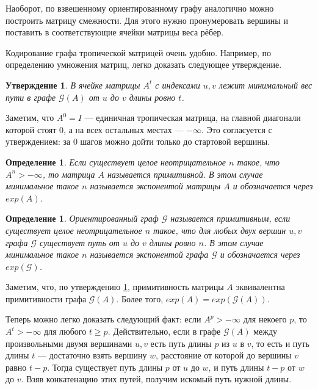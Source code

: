 \documentclass[12pt]{article}
\newtheorem{definition}[theorem]{Определение}
\newtheorem{proposition}[theorem]{Утверждение}
\begin{document}
Наоборот, по взвешенному ориентированному графу аналогично можно построить матрицу смежности. Для этого нужно пронумеровать вершины и поставить в соответствующие ячейки матрицы веса рёбер.

Кодирование графа тропической матрицей очень удобно. Например, по определению умножения матриц, легко доказать следующее утверждение.

\begin{proposition}
\label{entriesInPower}
В ячейке матрицы $A^t$ с индексами $u, v$ лежит минимальный вес пути в графе $\mathcal{G}(A)$ от $u$ до $v$ длины ровно $t$.
\end{proposition}

Заметим, что $A^0 = I$ --- единичная тропическая матрица, на главной диагонали которой стоят $0$, а на всех остальных местах --- $-\infty$. Это согласуется с утверждением: за $0$ шагов можно дойти только до стартовой вершины.

\begin{definition}
Если существует целое неотрицательное $n$ такое, что $A^n > -\infty$, то матрица $A$ называется примитивной. В этом случае минимальное такое $n$ называется экспонентой матрицы $A$ и обозначается через $exp(A)$.
\end{definition}

\begin{definition}
Ориентированный граф $\mathcal{G}$ называется примитивным, если существует целое неотрицательное $n$ такое, что для любых двух вершин $u, v$ графа $\mathcal{G}$ существует путь от $u$ до $v$ длины ровно $n$. В этом случае минимальное такое $n$ называется экспонентой графа $\mathcal{G}$ и обозначается через $exp(\mathcal{G})$.
\end{definition}

Заметим, что, по утверждению \ref{entriesInPower}, примитивность матрицы $A$ эквивалентна примитивности графа $\mathcal{G}(A)$. Более того, $exp(A) = exp(\mathcal{G}(A))$.

Теперь можно легко доказать следующий факт: если $A^p > -\infty$ для некоего $p$, то $A^t > -\infty$ для любого $t \ge p$. Действительно, если в графе $\mathcal{G}(A)$ между произвольными двумя вершинами $u, v$ есть путь длины $p$ из $u$ в $v$, то есть и путь длины $t$ --- достаточно взять вершину $w$, расстояние от которой до вершины $v$ равно $t - p$. Тогда существует путь длины $p$ от $u$ до $w$, и путь длины $t - p$ от $w$ до $v$. Взяв конкатенацию этих путей, получим искомый путь нужной длины.
\end{document}
